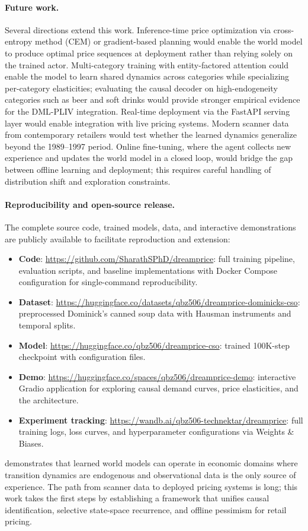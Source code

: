 \paragraph{Future work.} Several directions extend this work. Inference-time price optimization via cross-entropy method (CEM) or gradient-based planning would enable the world model to produce optimal price sequences at deployment rather than relying solely on the trained actor. Multi-category training with entity-factored attention could enable the model to learn shared dynamics across categories while specializing per-category elasticities; evaluating the causal decoder on high-endogeneity categories such as beer and soft drinks would provide stronger empirical evidence for the DML-PLIV integration. Real-time deployment via the FastAPI serving layer would enable integration with live pricing systems. Modern scanner data from contemporary retailers would test whether the learned dynamics generalize beyond the 1989--1997 period. Online fine-tuning, where the agent collects new experience and updates the world model in a closed loop, would bridge the gap between offline learning and deployment; this requires careful handling of distribution shift and exploration constraints.

\paragraph{Reproducibility and open-source release.} The complete source code, trained models, data, and interactive demonstrations are publicly available to facilitate reproduction and extension:
\begin{itemize}[nosep,leftmargin=*]
  \item \textbf{Code}: \url{https://github.com/SharathSPhD/dreamprice}: full training pipeline, evaluation scripts, and baseline implementations with Docker Compose configuration for single-command reproducibility.
  \item \textbf{Dataset}: \url{https://huggingface.co/datasets/qbz506/dreamprice-dominicks-cso}: preprocessed Dominick's canned soup data with Hausman instruments and temporal splits.
  \item \textbf{Model}: \url{https://huggingface.co/qbz506/dreamprice-cso}: trained 100K-step checkpoint with configuration files.
  \item \textbf{Demo}: \url{https://huggingface.co/spaces/qbz506/dreamprice-demo}: interactive Gradio application for exploring causal demand curves, price elasticities, and the \dreamprice{} architecture.
  \item \textbf{Experiment tracking}: \url{https://wandb.ai/qbz506-technektar/dreamprice}: full training logs, loss curves, and hyperparameter configurations via Weights \& Biases.
\end{itemize}

\dreamprice{} demonstrates that learned world models can operate in economic domains where transition dynamics are endogenous and observational data is the only source of experience. The path from scanner data to deployed pricing systems is long; this work takes the first steps by establishing a framework that unifies causal identification, selective state-space recurrence, and offline pessimism for retail pricing.
